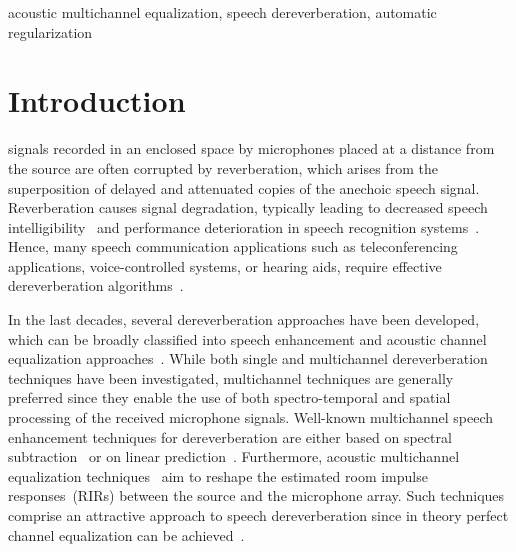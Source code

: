 \documentclass[10pt]{IEEEtran}
\begin{document}
\begin{IEEEkeywords}
acoustic multichannel equalization, speech dereverberation, automatic regularization
\end{IEEEkeywords}


\section{Introduction}
 signals recorded in an enclosed space by microphones placed at a distance from the source are often corrupted by reverberation, which arises from the superposition of delayed and attenuated copies of the anechoic speech signal.
Reverberation causes signal degradation, typically leading to decreased speech intelligibility~\cite{Houtgast_1985,Beutelmann_2006} and performance deterioration in speech recognition systems~\cite{Omologo_1998, Sehr_phd, Maas_ICASSP_2012}.
Hence, many speech communication applications such as teleconferencing applications, voice-controlled systems, or hearing aids, require effective dereverberation algorithms~\cite{Sehr_phd,Jeub_ITASP_2010,Maas_ICASSP_2012}.

In the last decades, several dereverberation approaches have been developed, which can be broadly classified into speech enhancement and acoustic channel equalization approaches~\cite{Naylor_Derev_book}.
While both single and multichannel dereverberation techniques have been investigated, multichannel techniques are generally preferred since they enable the use of both spectro-temporal and spatial processing of the received microphone signals.
Well-known multichannel speech enhancement techniques for dereverberation are either based on spectral subtraction~\cite{Habets_ITASLP_2008,Habets_ICASSP_2007} or on linear prediction~\cite{Gaubitch_JASA_2006,Delcroix_2007,Nakatani_ITASLP_2010}.
Furthermore, acoustic multichannel equalization techniques~\cite{Miyoshi_ITASS_1988,Kallinger_ICASSP_2006, Hikichi_EURASIP_2007, Mertins_ITASLP_2010, Zhang_IWAENC_2010, Haque_ITASLP_2011, Kodrasi_ICASSP_2012} aim to reshape the estimated room impulse responses~(RIRs) between the source and the microphone array.
Such techniques comprise an attractive approach to speech dereverberation since in theory perfect channel equalization can be achieved~\cite{Miyoshi_ITASS_1988, Hacihabibouglu_ITASLP_2012}.
\end{document}
